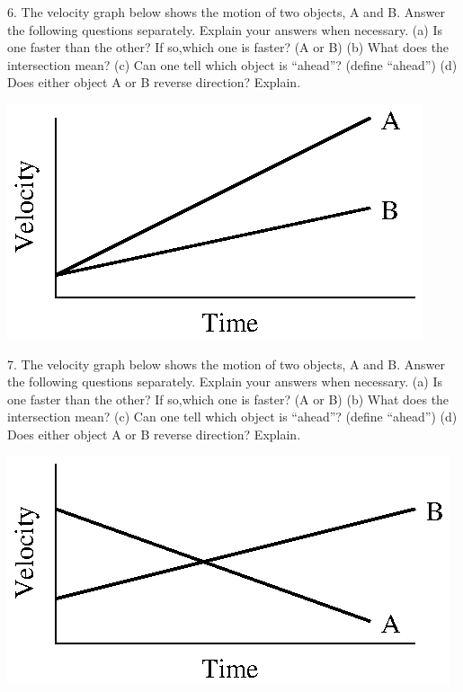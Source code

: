6. The velocity graph below shows the motion of two objects, A and B. Answer
the following questions separately. Explain your answers when necessary. (a)
Is one faster than the other? If so,which one is faster? (A or B) (b) What does
the intersection mean? (c) Can one tell which object is ``ahead''?
(define ``ahead'') (d) Does either object A or B reverse direction?
Explain.

\vspace{0.3cm}
{\par\raggedright \includegraphics{velocity/velocity_fig13.eps} \par}
\vspace{0.3cm}

7. The velocity graph below shows the motion of two objects, A and B. Answer
the following questions separately. Explain your answers when necessary. (a)
Is one faster than the other? If so,which one is faster? (A or B) (b) What does
the intersection mean? (c) Can one tell which object is ``ahead''?
(define ``ahead'') (d) Does either object A or B reverse direction?
Explain.

\vspace{0.3cm}
{\par\raggedright \includegraphics{velocity/velocity_fig14.eps} \par}
\vspace{0.3cm}

